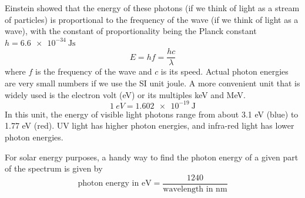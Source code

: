 \documentclass[class=scrartcl, crop=false,parskip=half]{standalone}
\begin{document}
Einstein showed that the energy of these photons (if we think of light as a stream of particles) is proportional to the frequency of the wave (if we think of light as a wave), with the constant of proportionality being the Planck constant $h=\SI{6.6e-34}{\joule\second}$
\begin{equation}
E=hf=\dfrac{hc}{\lambda}
\label{eq:hf}
\end{equation}
where $f$ is the frequency of the wave and $c$ is its speed. Actual photon energies are very small numbers if we use the SI unit joule. A more convenient unit that is widely used is the electron volt (eV) or its multiples keV and MeV. 
\begin{equation}
\SI{1}{eV}=\SI{1.602e-19}{\joule}
\label{eq:eV}
\end{equation}
In this unit, the energy of visible light photons range from about 3.1 eV (blue) to 1.77 eV (red). UV light has higher photon energies, and infra-red light has lower photon energies.

For solar energy purposes, a handy way to find the photon energy of a given part of the spectrum is given by
\begin{equation}
\text{photon energy in eV}=\dfrac{1240}{\text{wavelength in nm}}
\label{eq:eV2}
\end{equation}
\end{document}
